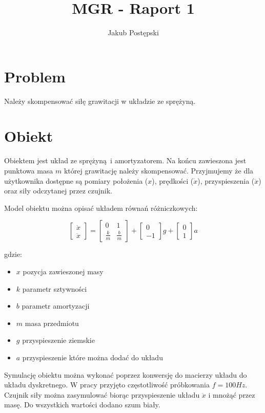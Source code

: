 \documentclass[a4paper]{article}
\title{MGR - Raport 1}
\author{Jakub Postępski}
\begin{document}
\maketitle

\section{Problem}
Należy skompensować siłę grawitacji w układzie ze sprężyną.

\section{Obiekt}
Obiektem jest układ ze sprężyną i amortyzatorem. Na końcu zawieszona jest punktowa masa $m$ której grawitację należy skompensować. Przyjmujemy że dla użytkownika dostępne są pomiary położenia ($x$), prędkości ($\dot{x}$), przyspieszenia ($\ddot{x}$) oraz siły odczytanej przez czujnik.

Model obiektu można opisać układem równań różniczkowych:

\[
\begin{bmatrix}
    \dot{x} \\
    \ddot{x}
\end{bmatrix}
=
\begin{bmatrix}
    0 & 1 \\
    \frac{k}{m} & \frac{b}{m}
\end{bmatrix}
+
\begin{bmatrix}
    0 \\
    -1
\end{bmatrix}
g+
\begin{bmatrix}
    0\\
    1
\end{bmatrix}a
\]

gdzie:
\begin{itemize}
	\item $x$ pozycja zawieszonej masy
	\item $k$ parametr sztywności
	\item $b$ parametr amortyzacji
	\item $m$ masa przedmiotu
	\item $g$ przyspieszenie ziemskie
	\item $a$ przyspieszenie które można dodać do układu
\end{itemize}

Symulację obiektu można wykonać poprzez konwersję do macierzy układu do układu dyskretnego. W pracy przyjęto częstotliwość próbkowania $f = 100 Hz$. Czujnik siły można zasymulować biorąc przyspieszenie układu $\ddot{x}$ i mnożąć przez masę. Do wszystkich wartości dodano szum biały.
\end{document}
